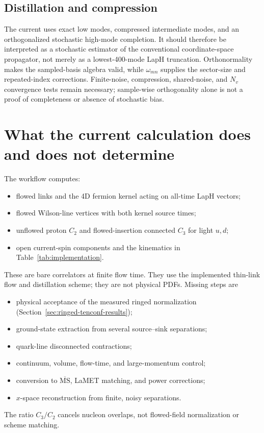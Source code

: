 \documentclass[11pt]{article}
\numberwithin{equation}{section}
\newcommand{\MSbar}{\overline{\mathrm{MS}}}
\begin{document}
\subsection{Distillation and compression}

The current uses exact low modes, compressed intermediate modes, and an
orthogonalized stochastic high-mode completion.  It should therefore be
interpreted as a stochastic estimator of the conventional coordinate-space
propagator, not merely as a lowest-400-mode LapH truncation.  Orthonormality
makes the sampled-basis algebra valid, while \(\omega_{mn}\) supplies the
sector-size and repeated-index corrections.  Finite-noise, compression,
shared-noise, and \(N_v\) convergence tests remain necessary; sample-wise
orthogonality alone is not a proof of completeness or absence of stochastic
bias.

\section{What the current calculation does and does not determine}

The workflow computes:
\begin{itemize}
  \item flowed links and the 4D fermion kernel acting on all-time LapH vectors;
  \item flowed Wilson-line vertices with both kernel source times;
  \item unflowed proton \(C_2\) and flowed-insertion connected \(C_3\) for
        light \(u,d\);
  \item open current-spin components and the kinematics in
        Table~\ref{tab:implementation}.
\end{itemize}

These are bare correlators at finite flow time. They use the implemented
thin-link flow and distillation scheme; they are not physical PDFs. Missing
steps are
\begin{itemize}
  \item physical acceptance of the measured ringed normalization
        (Section~\ref{sec:ringed-tenconf-results});
  \item ground-state extraction from several source--sink separations;
  \item quark-line disconnected contractions;
  \item continuum, volume, flow-time, and large-momentum control;
  \item conversion to \(\MSbar\), LaMET matching, and power corrections;
  \item \(x\)-space reconstruction from finite, noisy separations.
\end{itemize}
The ratio \(C_3/C_2\) cancels nucleon overlaps, not flowed-field normalization
or scheme matching.
\end{document}
